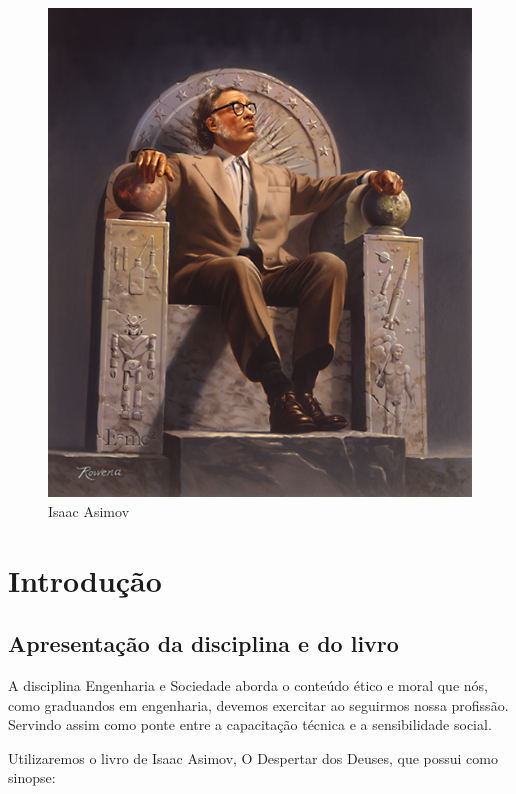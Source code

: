 \documentclass[14pt,portuguese]{extreport}
\begin{document}
  \newpage
  \begin{figure}[h]
    \centering
    \includegraphics[width=\textwidth]{asimov_sentado}
    \caption{Isaac Asimov}
  \end{figure}

  
  \chapter{Introdução}

    \section{Apresentação da disciplina e do livro}
      
      A disciplina Engenharia e Sociedade aborda o conteúdo ético
      e moral que nós, como graduandos em engenharia, devemos
      exercitar ao seguirmos nossa profissão. Servindo assim como ponte
      entre a capacitação técnica e a sensibilidade social.
      
      Utilizaremos o livro de Isaac Asimov, O Despertar dos Deuses,
      que possui como sinopse:
      
\end{document}
